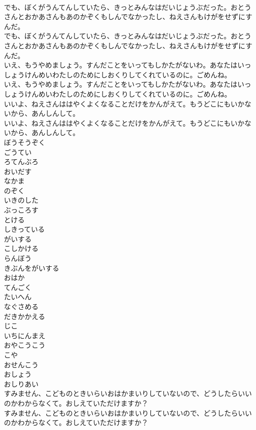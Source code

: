 \documentclass[8pt]{extreport}
\begin{document}
\begin{CJK}{UTF8}{min}
\\	でも、ぼくがうんてんしていたら、きっとみんなはだいじょうぶだった。おとうさんとおかあさんもあのかぞくもしんでなかったし、ねえさんもけがをせずにすんだ。
\\	でも、ぼくがうんてんしていたら、きっとみんなはだいじょうぶだった。おとうさんとおかあさんもあのかぞくもしんでなかったし、ねえさんもけがをせずにすんだ。
\\	いえ、もうやめましょう。すんだことをいってもしかたがないわ。あなたはいっしょうけんめいわたしのためにしおくりしてくれているのに。ごめんね。
\\	いえ、もうやめましょう。すんだことをいってもしかたがないわ。あなたはいっしょうけんめいわたしのためにしおくりしてくれているのに。ごめんね。
\\	いいよ、ねえさんははやくよくなることだけをかんがえて。もうどこにもいかないから、あんしんして。
\\	いいよ、ねえさんははやくよくなることだけをかんがえて。もうどこにもいかないから、あんしんして。
\\	ぼうそうぞく
\\	ごうてい
\\	ろてんぶろ
\\	おいだす
\\	なかま
\\	のぞく
\\	いきのした
\\	ぶっころす
\\	とける
\\	しきっている
\\	がいする
\\	こしかける
\\	らんぼう
\\	きぶんをがいする
\\	おはか
\\	てんごく
\\	たいへん
\\	なぐさめる
\\	だきかかえる
\\	じこ
\\	いちにんまえ
\\	おやこうこう
\\	こや
\\	おせんこう
\\	おしょう
\\	おしりあい
\\	すみません、こどものときいらいおはかまいりしていないので、どうしたらいいのかわからなくて。おしえていただけますか？
\\	すみません、こどものときいらいおはかまいりしていないので、どうしたらいいのかわからなくて。おしえていただけますか？

\end{CJK}
\end{document}
